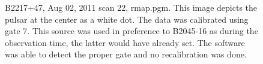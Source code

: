 \documentclass[a4paper,12pt]{article}
\begin{document}
\begin{figure}
                                                                                                                                                                                                                                                                                                                                                  \caption{B2217+47, Aug 02, 2011 scan 22, rmap.pgm. This image depicts the pulsar at the center as a white dot. The data was calibrated using gate 7. This source was used in preference to B2045-16 as during the observation time, the latter would have already set. The software was able to detect the proper gate and no recalibration was done. \label{fig:rmap}}
                                                                                                                                                                                                                                                                                                                                                                                                                                                                                                                                                                                                                                                                                                                                                                                                                                                                                                                                                                                                                                                                                                                                                                                                                                                                                                                                                                                                                                                                                                                                                                                                                                                                                                                                                                                                                                                                                                                                                                                                                                                                                                                                                                                                                                                                                                                                                                                                                                                                                                                                                                                                                                                                                                                               
\end{figure}
\end{document}
